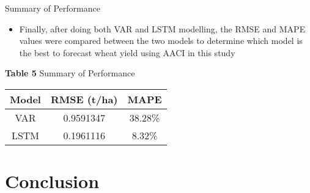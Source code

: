 \documentclass[aspectratio=169]{beamer}
\begin{document}

\begin{frame}{Summary of Performance}
\begin{center}
    \begin{itemize}
        \item Finally, after doing both VAR and LSTM modelling, the RMSE and MAPE values were compared between the two models to determine which model is the best to forecast wheat yield using AACI in this study
    \end{itemize}
    \vspace{0.5cm}
             \scriptsize{\textbf{Table 5} Summary of Performance}\\
                \begin{tabular}{||c c c||} 
                \hline
                Model & RMSE (t/ha) & MAPE \\ [0.5ex] 
                 \hline\hline
                 VAR & 0.9591347 & 38.28\% \\
                 \hline
                 LSTM & 0.1961116 & 8.32\% \\ [1ex] 
                 \hline
                \end{tabular}       
\end{center}
\end{frame}

\section{Conclusion}
\end{document}
